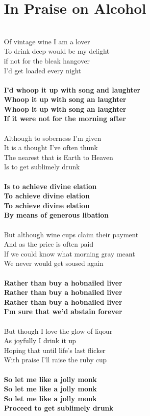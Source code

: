 \documentclass[letterpaper,9pt]{article}
\begin{document}
\section{In Praise on Alcohol}
\noindent
\\Of vintage wine I am a lover
\\To drink deep would be my delight
\\if not for the bleak hangover
\\I'd get loaded every night
\\
\\\textbf{I'd whoop it up with song and laughter
\\Whoop it up with song an laughter
\\Whoop it up with song an laughter
\\If it were not for the morning after}
\\
\\Although to soberness I'm given
\\It is a thought I've often thunk
\\The nearest that is Earth to Heaven
\\Is to get sublimely drunk
\\
\\\textbf{Is to achieve divine elation
\\To achieve divine elation
\\To achieve divine elation
\\By means of generous libation}
\\
\\But although wine cups claim their payment
\\And as the price is often paid
\\If we could know what morning gray meant
\\We never would get soused again
\\
\\\textbf{Rather than buy a hobnailed liver
\\Rather than buy a hobnailed liver
\\Rather than buy a hobnailed liver
\\I'm sure that we'd abstain forever}
\\
\\But though I love the glow of liqour
\\As joyfully I drink it up
\\Hoping that until life's last flicker
\\With praise I'll raise the ruby cup
\\
\\\textbf{So let me like a jolly monk
\\So let me like a jolly monk
\\So let me like a jolly monk
\\Proceed to get sublimely drunk}
\end{document}
